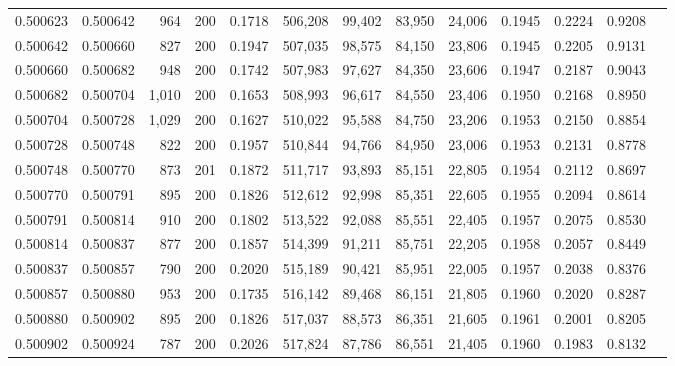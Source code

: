 \begin{tabular}{rrrrrrrrrrrrr}
0.500623 & 0.500642 &   964 & 200 &                                     0.1718 & 506,208 &  99,402 &  83,950 &  24,006 & 0.1945 & 0.2224 & 0.9208 \\
0.500642 & 0.500660 &   827 & 200 &                                     0.1947 & 507,035 &  98,575 &  84,150 &  23,806 & 0.1945 & 0.2205 & 0.9131 \\
0.500660 & 0.500682 &   948 & 200 &                                     0.1742 & 507,983 &  97,627 &  84,350 &  23,606 & 0.1947 & 0.2187 & 0.9043 \\
0.500682 & 0.500704 & 1,010 & 200 &                                     0.1653 & 508,993 &  96,617 &  84,550 &  23,406 & 0.1950 & 0.2168 & 0.8950 \\
0.500704 & 0.500728 & 1,029 & 200 &                                     0.1627 & 510,022 &  95,588 &  84,750 &  23,206 & 0.1953 & 0.2150 & 0.8854 \\
0.500728 & 0.500748 &   822 & 200 &                                     0.1957 & 510,844 &  94,766 &  84,950 &  23,006 & 0.1953 & 0.2131 & 0.8778 \\
0.500748 & 0.500770 &   873 & 201 &                                     0.1872 & 511,717 &  93,893 &  85,151 &  22,805 & 0.1954 & 0.2112 & 0.8697 \\
0.500770 & 0.500791 &   895 & 200 &                                     0.1826 & 512,612 &  92,998 &  85,351 &  22,605 & 0.1955 & 0.2094 & 0.8614 \\
0.500791 & 0.500814 &   910 & 200 &                                     0.1802 & 513,522 &  92,088 &  85,551 &  22,405 & 0.1957 & 0.2075 & 0.8530 \\
0.500814 & 0.500837 &   877 & 200 &                                     0.1857 & 514,399 &  91,211 &  85,751 &  22,205 & 0.1958 & 0.2057 & 0.8449 \\
0.500837 & 0.500857 &   790 & 200 &                                     0.2020 & 515,189 &  90,421 &  85,951 &  22,005 & 0.1957 & 0.2038 & 0.8376 \\
0.500857 & 0.500880 &   953 & 200 &                                     0.1735 & 516,142 &  89,468 &  86,151 &  21,805 & 0.1960 & 0.2020 & 0.8287 \\
0.500880 & 0.500902 &   895 & 200 &                                     0.1826 & 517,037 &  88,573 &  86,351 &  21,605 & 0.1961 & 0.2001 & 0.8205 \\
0.500902 & 0.500924 &   787 & 200 &                                     0.2026 & 517,824 &  87,786 &  86,551 &  21,405 & 0.1960 & 0.1983 & 0.8132 \\

\end{tabular}
